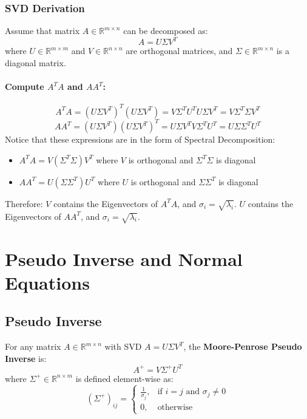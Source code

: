 \documentclass{article}
\begin{document}
\subsubsection{SVD Derivation}
Assume that matrix $A \in \mathbb{R}^{m \times n}$ can be decomposed as:
\[
    A = U \Sigma V^T
\]
where $U \in \mathbb{R}^{m \times m}$ and $V \in \mathbb{R}^{n \times n}$ are orthogonal matrices, and $\Sigma \in \mathbb{R}^{m \times n}$ is a diagonal matrix.

\paragraph{Compute $A^T A$ and $AA^T$:}
\[
    A^T A = (U \Sigma V^T)^T (U \Sigma V^T) = V \Sigma^T U^T U \Sigma V^T = V \Sigma^T \Sigma V^T
\]
\[
    AA^T = (U \Sigma V^T)(U \Sigma V^T)^T = U \Sigma V^T V \Sigma^T U^T = U \Sigma \Sigma^T U^T
\]
Notice that these expressions are in the form of Spectral Decomposition:
\begin{itemize}
    \item $A^T A = V (\Sigma^T \Sigma) V^T$ where $V$ is orthogonal and $\Sigma^T \Sigma$ is diagonal
    \item $AA^T = U (\Sigma \Sigma^T) U^T$ where $U$ is orthogonal and $\Sigma \Sigma^T$ is diagonal
\end{itemize}
Therefore: $V$ contains the Eigenvectors of $A^T A$, and $\sigma_i = \sqrt{\lambda_i}$. $U$ contains the Eigenvectors of $AA^T$, and $\sigma_i = \sqrt{\lambda_i}$.


\newpage
\section{Pseudo Inverse and Normal Equations}

\subsection{Pseudo Inverse}

For any matrix $A \in \mathbb{R}^{m \times n}$ with SVD $A = U \Sigma V^T$, the \textbf{Moore-Penrose Pseudo Inverse} is:
\[
    A^+ = V \Sigma^+ U^T
\]
where $\Sigma^+ \in \mathbb{R}^{n \times m}$ is defined element-wise as:
\[
    (\Sigma^+)_{ij} =
    \begin{cases}
        \frac{1}{\sigma_j}, & \text{if } i = j \text{ and } \sigma_j \neq 0 \\
        0, & \text{otherwise}
    \end{cases}
\]
\end{document}
